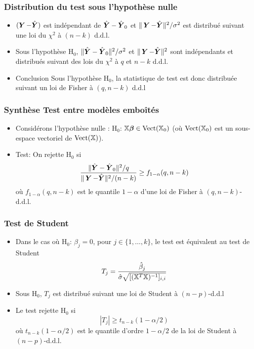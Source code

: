 \begin{frame}
\frametitle{Distribution du test sous l'hypothèse nulle}
\begin{itemize}
\item $(\operatorname{\boldsymbol{Y}} - \hat{\boldsymbol{Y}})$ est indépendant de $\hat{\boldsymbol{Y}} - \hat{\boldsymbol{Y}}_0$ et $\| \operatorname{\boldsymbol{Y}} - \hat{\boldsymbol{Y}} \|^2/ \sigma^2$ est distribué suivant une loi du $\chi^2$ à $(n-k)$ d.d.l.
\item Sous l'hypothèse $\mathrm{H}_0$, $\| \hat{\boldsymbol{Y}} - \hat{\boldsymbol{Y}}_0 \|^2/\sigma^2$ et $\| \operatorname{\boldsymbol{Y}} - \hat{\boldsymbol{Y}} \|^2$ sont \alert{indépendants} et distribués suivant des lois du $\chi^2$ à \alert{$q$} et \alert{$n-k$} d.d.l.
\item \alert{Conclusion}  Sous l'hypothèse $\mathrm{H}_0$, la statistique de test est donc distribuée suivant \alert{un loi de Fisher} à $(q,n-k)$ d.d.l
\end{itemize}
\end{frame}

\begin{frame}
\frametitle{Synthèse Test entre mod\`{e}les emboît\'{e}s}
\begin{itemize}
\item Considérons l'hypothèse  nulle : $\mathrm{H}_0$: $\mathbb{X} \boldsymbol{\beta} \in \mathrm{Vect}(\mathbb{X}_0)$ (où $\mathrm{Vect}(\mathbb{X}_0)$ est un sous-espace vectoriel de $\mathrm{Vect}(\mathbb{X})$).
\item \alert{Test:} On rejette $\mathrm{H}_0$ si 
\alert{
\[
\frac{\|\hat{\boldsymbol{Y}} - \hat{\boldsymbol{Y}}_0\|^2/q}{\|\operatorname{\boldsymbol{Y}} - \hat{\boldsymbol{Y}}\|^2/(n-k)} \geq f_{1-\alpha}(q,n-k)
\]
}
où $f_{1-\alpha}(q,n-k)$ est le quantile $1-\alpha$ d'une loi de Fisher à $(q,n-k)$-d.d.l. 
\end{itemize}
\end{frame}

\begin{frame}
\frametitle{Test de Student}
\begin{itemize}
  \item Dans le cas où $\mathrm{H}_0$: $\beta_j=0$, pour $j \in \{1,\dots,k\}$, le test est équivalent au test de Student
  \alert{
  \[
  T_j = \frac{\hat{\beta}_j}{\hat{\sigma}\sqrt{[(\mathbb{X}^T\mathbb{X})^{-1}]_{i,i}}}
  \]
  }
  \item Sous $\mathrm{H}_0$, $T_j$ est distribué suivant une loi de Student à $(n-p)$-d.d.l
  \item Le test rejette $\mathrm{H}_0$ si 
  \[
  |T_j| \geq t_{n-k}(1-\alpha/2) 
  \]
  où $t_{n-k}(1-\alpha/2)$ est le quantile d'ordre $1-\alpha/2$ de la loi de Student à $(n-p)$-d.d.l. 
\end{itemize}
\end{frame}


